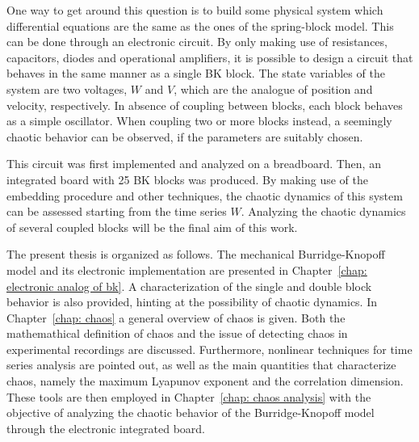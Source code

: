 One way to get around this question is to build some physical system which differential equations
are the same as the ones of the spring-block model. This can be done through an electronic circuit. By only
making use of resistances, capacitors, diodes and operational amplifiers, it is possible to design
a circuit that behaves in the same manner as a single BK block. The state variables
of the system are two voltages, $W$ and $V$, which are the analogue of position and velocity, respectively.
In absence of coupling between blocks, each block behaves as a simple oscillator. When coupling two or
more blocks instead, a seemingly chaotic behavior can be observed, if the parameters are suitably
chosen.

This circuit was first implemented and analyzed on a breadboard.
Then, an integrated board with 25 BK blocks was produced. By making use of the embedding procedure
and other techniques, the chaotic dynamics of this system can be assessed starting from the time
series $W$. Analyzing the chaotic dynamics of several coupled blocks will be the final aim of this work.

The present thesis is organized as follows. The mechanical Burridge-Knopoff model and its electronic
implementation are presented in Chapter~\ref{chap: electronic analog of bk}. A characterization of the
single and double block behavior is also provided, hinting at the possibility of chaotic dynamics.
In Chapter~\ref{chap: chaos} a general overview of chaos is given. Both the mathemathical definition
of chaos and the issue of detecting chaos in experimental recordings are discussed. Furthermore,
nonlinear techniques for time series analysis are pointed out, as well as the main quantities that
characterize chaos, namely the maximum Lyapunov exponent and the correlation dimension.
These tools are then employed in Chapter~\ref{chap: chaos analysis} with the objective of analyzing
the chaotic behavior of the Burridge-Knopoff model through the electronic integrated board.














